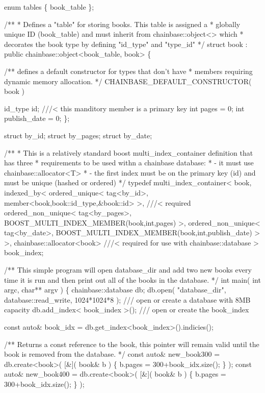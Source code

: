 \begin{DoxyCode}
enum tables \{
   book\_table
\};

/**
 * Defines a "table" for storing books. This table is assigned a 
 * globally unique ID (book\_table) and must inherit from chainbase::object<> which
 * decorates the book type by defining "id\_type" and "type\_id" 
 */
struct book : public chainbase::object<book\_table, book> \{

   /** defines a default constructor for types that don't have
     * members requiring dynamic memory allocation.
     */
   CHAINBASE\_DEFAULT\_CONSTRUCTOR( book )

   id\_type          id; ///< this manditory member is a primary key
   int pages        = 0;
   int publish\_date = 0;
\};

struct by\_id;
struct by\_pages;
struct by\_date;

/**
 * This is a relatively standard boost multi\_index\_container definition that has three 
 * requirements to be used withn a chainbase database:
 *   - it must use chainbase::allocator<T> 
 *   - the first index must be on the primary key (id) and must be unique (hashed or ordered)
 */
typedef multi\_index\_container<
  book,
  indexed\_by<
     ordered\_unique< tag<by\_id>, member<book,book::id\_type,&book::id> >, ///< required 
     ordered\_non\_unique< tag<by\_pages>, BOOST\_MULTI\_INDEX\_MEMBER(book,int,pages) >,
     ordered\_non\_unique< tag<by\_date>, BOOST\_MULTI\_INDEX\_MEMBER(book,int,publish\_date) >
  >,
  chainbase::allocator<book> ///< required for use with chainbase::database
> book\_index;

/**
    This simple program will open database\_dir and add two new books every time
    it is run and then print out all of the books in the database.
 */
int main( int argc, char** argv ) \{
   chainbase::database db;
   db.open( "database\_dir", database::read\_write, 1024*1024*8 ); /// open or create a database with 8MB
       capacity
   db.add\_index< book\_index >(); /// open or create the book\_index 


   const auto& book\_idx = db.get\_index<book\_index>().indicies();

   /**
      Returns a const reference to the book, this pointer will remain
      valid until the book is removed from the database.
    */
   const auto& new\_book300 = db.create<book>( [&]( book& b ) \{
       b.pages = 300+book\_idx.size();
   \} );
   const auto& new\_book400 = db.create<book>( [&]( book& b ) \{
       b.pages = 300+book\_idx.size();
   \} );


\end{DoxyCode}
